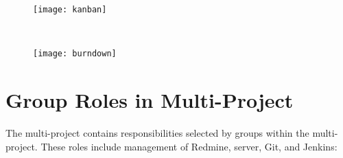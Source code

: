 \begin{figure}
\centering
\begin{minipage}{.47\textwidth}
  \centering
  \texttt{[image: kanban]}
  \label{fig:kanban_board}
\end{minipage}
~~~~
\begin{minipage}{.47\textwidth}
  \centering
  \texttt{[image: burndown]}
  \label{fig:burndown_chart}
\end{minipage}
\end{figure}

\section{Group Roles in Multi-Project}\label{sec:multi_project_group_roles}
The multi-project contains responsibilities selected by groups within the multi-project. These roles include management of Redmine, server, Git, and Jenkins:

